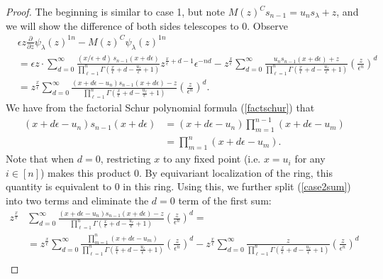 \documentclass[12pt]{article}
\theoremstyle{plain}
\theoremstyle{definition}
\begin{document}
\begin{proof}
The beginning is similar to case 1, but note $M(z)^C s_{n-1}=u_n s_\lambda +z$, and we will show the difference of both sides telescopes to 0. Observe
\begin{align}
      &\epsilon z \frac{\partial }{\partial z} \psi_{\lambda}(z)^{1n} - M(z)^{C} \psi_\lambda(z)^{1n} \nonumber\\
      &= \epsilon z \cdot   \sum_{d=0} ^\infty \frac{(x/\epsilon +d)\, s_{n-1} (x+d \epsilon) }{\prod_{\ell=1} ^n \Gamma \left(\frac{x}{\epsilon}+d-\frac{u_\ell}{\epsilon}+1\right)} z^{\frac{x}{\epsilon}+d-1}{\epsilon^{-nd}}-        z^{\frac{x}{\epsilon}}     \sum_{d=0} ^\infty \frac{ u_{n} s_{n-1} (x+d \epsilon) +z }{\prod_{\ell=1} ^n \Gamma \left(\frac{x}{\epsilon}+d-\frac{u_\ell}{\epsilon}+1\right)}\left(\frac{z}{\epsilon^n}\right)^d \nonumber \\
      &=z^{\frac{x}{\epsilon}}     \sum_{d=0} ^\infty \frac{ (x+d\epsilon-u_n) s_{n-1} (x+d \epsilon) -z }{\prod_{\ell=1} ^n \Gamma \left(\frac{x}{\epsilon}+d-\frac{u_\ell}{\epsilon}+1\right)}\left(\frac{z}{\epsilon^n}\right)^d.\label{case2sum}
  \end{align}
We have from the factorial Schur polynomial formula (\ref{factschur}) that
\begin{align*}
    (x+d\epsilon-u_n) s_{n-1} (x+d \epsilon)&= (x+d\epsilon-u_n) \prod_{m=1} ^{n-1} (x+d\epsilon - u_m)\\
    &= \prod_{m=1} ^{n} (x+d\epsilon - u_m).
\end{align*}
Note that when $d=0$, restricting $x$ to any fixed point (i.e. $x=u_i$ for any $i\in [n]$) makes this product 0. By equivariant localization of the ring, this quantity is equivalent to 0 in this ring. Using this, we further split (\ref{case2sum}) into two terms and eliminate the $d=0$ term of the first sum:
\begin{align}
    z^{\frac{x}{\epsilon}}     &\sum_{d=0} ^\infty \frac{ (x+d\epsilon-u_n) s_{n-1} (x+d \epsilon) -z }{\prod_{\ell=1} ^n \Gamma \left(\frac{x}{\epsilon}+d-\frac{u_\ell}{\epsilon}+1\right)}\left(\frac{z}{\epsilon^n}\right)^d = \nonumber\\
    &=z^{\frac{x}{\epsilon}}     \sum_{d=0} ^\infty \frac{ \prod_{m=1} ^{n} (x+d\epsilon - u_m) }{\prod_{\ell=1} ^n \Gamma \left(\frac{x}{\epsilon}+d-\frac{u_\ell}{\epsilon}+1\right)}\left(\frac{z}{\epsilon^n}\right)^d - z^{\frac{x}{\epsilon}}     \sum_{d=0} ^\infty \frac{ z }{\prod_{\ell=1} ^n \Gamma \left(\frac{x}{\epsilon}+d-\frac{u_\ell}{\epsilon}+1\right)}\left(\frac{z}{\epsilon^n}\right)^d \nonumber\\

\end{align}
\end{proof}
\end{document}
